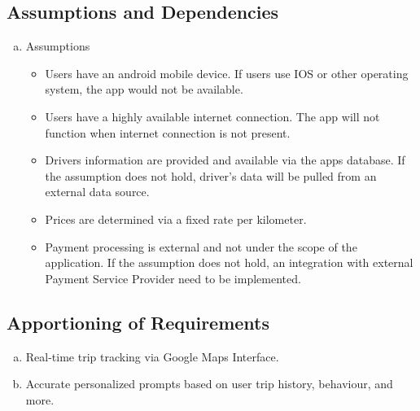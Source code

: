 \documentclass[]{article}
\begin{document}

\subsection{Assumptions and Dependencies}
\label{sub:assumptions_and_dependencies}


\begin{enumerate}[a)]
	\item Assumptions

	\begin{itemize}
		\item Users have an android mobile device. If users use IOS or other operating system, the app would not be available.
		\item Users have a highly available internet connection. The app will not function when internet connection is not present.
		\item Drivers information are provided and available via the app\textquotesingle s database. If the assumption does not hold, driver's data will be pulled from an external data source.
		\item Prices are determined via a fixed rate per kilometer.
		\item Payment processing is external and not under the scope of the application. If the assumption does not hold, an integration with external Payment Service Provider need to be implemented.
	\end{itemize}

\end{enumerate}

\subsection{Apportioning of Requirements}
\label{sub:apportioning_of_requirements}

\begin{enumerate}[a)]
	\item Real-time trip tracking via Google Maps Interface.
	\item Accurate personalized prompts based on user trip history, behaviour, and more. 
\end{enumerate}


\end{document}
